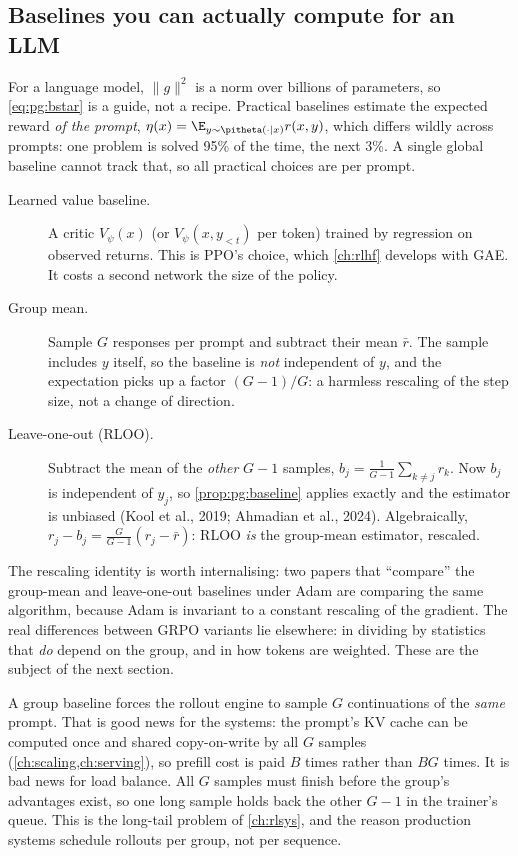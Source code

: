 \subsection{Baselines you can actually compute for an LLM}\label{sec:pg:practical}

For a language model, $\|g\|^2$ is a norm over billions of parameters, so \cref{eq:pg:bstar}
is a guide, not a recipe. Practical baselines estimate the expected reward \emph{of the
prompt}, $\eta(x)=\E_{y\sim\pitheta(\cdot\mid x)}r(x,y)$, which differs wildly across prompts:
one problem is solved 95\% of the time, the next 3\%. A single global baseline cannot track
that, so all practical choices are per prompt.

\begin{description}
\item[Learned value baseline.] A critic $V_\psi(x)$ (or $V_\psi(x,y_{<t})$ per token) trained
  by regression on observed returns. This is PPO's choice, which \cref{ch:rlhf} develops with
  GAE. It costs a second network the size of the policy.
\item[Group mean.] Sample $G$ responses per prompt and subtract their mean $\bar r$. The
  sample includes $y$ itself, so the baseline is \emph{not} independent of $y$, and the
  expectation picks up a factor $(G-1)/G$: a harmless rescaling of the step size, not a
  change of direction.
\item[Leave-one-out (RLOO).] Subtract the mean of the \emph{other} $G-1$ samples,
  $b_j=\frac{1}{G-1}\sum_{k\ne j}r_k$. Now $b_j$ is independent of $y_j$, so
  \cref{prop:pg:baseline} applies exactly and the estimator is unbiased (Kool et al., 2019;
  Ahmadian et al., 2024). Algebraically, $r_j-b_j=\frac{G}{G-1}(r_j-\bar r)$: RLOO \emph{is}
  the group-mean estimator, rescaled.
\end{description}
The rescaling identity is worth internalising: two papers that ``compare'' the group-mean
and leave-one-out baselines under Adam are comparing the same algorithm, because Adam is
invariant to a constant rescaling of the gradient. The real differences between GRPO
variants lie elsewhere: in dividing by statistics that \emph{do} depend on the group, and in
how tokens are weighted. These are the subject of the next section.

\begin{systemslens}
A group baseline forces the rollout engine to sample $G$ continuations of the \emph{same}
prompt. That is good news for the systems: the prompt's KV cache can be computed once and
shared copy-on-write by all $G$ samples (\cref{ch:scaling,ch:serving}), so prefill cost is
paid $B$ times rather than $BG$ times. It is bad news for load balance. All $G$ samples must
finish before the group's advantages exist, so one long sample holds back the other
$G-1$ in the trainer's queue. This is the long-tail problem of \cref{ch:rlsys}, and the reason
production systems schedule rollouts per group, not per sequence.
\end{systemslens}

